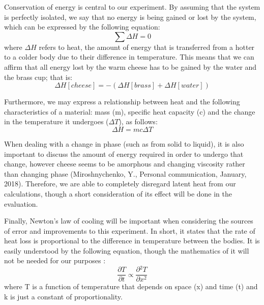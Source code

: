 Conservation of energy is central to our experiment. By assuming that the system is perfectly isolated, we say that no energy is being gained or lost by the system, which can be expressed by the following equation:
\begin{equation}
	\sum \Delta H = 0
\end{equation}
where $\Delta H$ refers to heat, the amount of energy that is transferred from a hotter to a colder body due to their difference in temperature. This means that we can affirm that all energy lost by the warm cheese has to be gained by the water and the brass cup; that is:
\begin{equation} \label{eq:ConservationOfHeat}
	\Delta H[cheese] = -(\Delta H[brass] + \Delta H[water])
\end{equation}

Furthermore, we may express a relationship between heat and the following characteristics of a material: mass (m), specific heat capacity (c) and the change in the temperature it undergoes ($\Delta T$), as follows:
\begin{equation} \label{eq:DeltaH}
	\Delta H = mc\Delta T
\end{equation}

When dealing with a change in phase (such as from solid to liquid), it is also important to discuss the amount of energy required in order to undergo that change, however cheese seems to be amorphous and changing viscosity rather than changing phase (Miroshnychenko, Y., Personal communication, January, 2018). Therefore, we are able to completely disregard latent heat from our calculations, though a short consideration of its effect will be done in the evaluation.

Finally, Newton's law of cooling will be important when considering the sources of error and improvements to this experiment. In short, it states that the rate of heat loss is proportional to the difference in temperature between the bodies. It is easily understood by the following equation, though the mathematics of it will not be needed for our purposes \citep[pp.12-18]{Lienhard2001Heat}:
\begin{equation}
	\frac{\partial T}{\partial t} \propto \frac{\partial {^2} T}{\partial x^2}
\end{equation}
where T is a function of temperature that depends on space (x) and time (t) and k is just a constant of proportionality.
